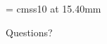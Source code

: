 \documentclass[11pt]{beamer}
\newcommand\<{\langle}
\renewcommand\>{\rangle}
\begin{document}
\begin{frame}[plain]

  \begin{columns}
    \begin{column}{\textwidth}
      \begin{center}

        \font\endfont = cmss10 at 15.40mm
        \endfont
        \baselineskip 20.0mm

        Questions?

      \end{center}

    \end{column}
  \end{columns}

\end{frame}

\begin{frame}
  \printbibliography
\end{frame}
\end{document}
